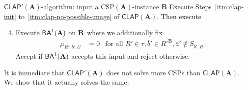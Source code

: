\documentclass[a4paper,english, thm-restate]{lipics-v2021}
\newcommand{\tup}[1]{\bar{#1}}
\newcommand{\sig}{\tau}
\newcommand{\StructA}{\mathbf{A}}
\newcommand{\StructB}{\mathbf{B}}
\newcommand{\CSP}[1]{\mathrm{CSP}(#1)}
\newcommand{\CLAP}[1]{\mathsf{CLAP}(#1)}
\newcommand{\CLAPw}[1]{\mathsf{CLAP'}(#1)}
\begin{document}
	\begin{algobox}[top=0.4em]{$\CLAPw{\StructA}$-algorithm: input a $\CSP{\StructA}$-instance $\StructB$}
		Execute Steps~\ref{itm:clap-init} to~\ref{itm:clap-no-possible-image} of $\CLAP{\StructA}$. Then execute
		\begin{enumerate}[label=\arabic*$'$.,ref=\arabic*$'$]
			\setcounter{enumi}{3}
			\item Execute $\BAk{1}{\StructA}$ on $\StructB$\, where we additionally fix
			\begin{align*}
				\mu_{R',\tup{b}',\tup{a}'}& = 0 &\text{for all } R' \in \sig, \tup{b}' \in R'^\StructB, \tup{a}' \not\in S_{\tup{b}',R'}.
			\end{align*}
			Accept if $\BAk{1}{\StructA}$ accepts this input and reject otherwise.\label{itm:clap'-call-bak}
		\end{enumerate}
	\end{algobox}
	\noindent It is immediate that $\CLAPw{\StructA}$ does not solve more CSPs than $\CLAP{\StructA}$.
	We show that it actually solves the same:
	
\end{document}
